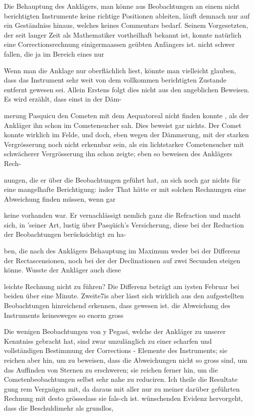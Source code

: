\documentclass[10pt,a4paper]{article}
\begin{document}
Die Behauptung des Anklägers, man könne aus Beobachtungen an einem nicht berichtigten Instrumente keine richtige Positionen ableiten, läuft demnach nur auf ein Geständniss hinaus, welches keines Commentars bedarf. Seinem Vorgesetzten, der seit langer Zeit als Mathematiker vortheilhaft bekannt ist, konnte natürlich eine Correctionsrechnung einigermaassen geübten Anfängers ist. nicht schwer fallen, die ja im Bereich eines nur

Wenn man die Anklage nur oberflächlich liest, könnte man vielleicht glauben, dass das Instrument sehr weit von dem vollkommen berichtigten Zustande entfernt gewesen sei. Allein Erstens folgt dies nicht aus den angeblichen Beweisen. Es wird erzählt, dass einst in der Däm-

merung Pasquicu den Cometen mit dem Aequatoreal nicht finden konnte , als der Ankläger ihn schon im Cometensucher sah. Dies beweist gar nichts. Der Comet konnte wirklich im Felde, und doch, eben wegen der Dämmerung, mit der starken Vergrösserung noch nicht erkennbar sein, als ein lichtstarker Cometensucher mit schwächerer Vergrösserung ihn schon zeigte; eben so beweisen des Anklägers Rech-

nungen, die er über die Beobachtungen geführt hat, an sich noch gar nichts für eine mangelhafte Berichtigung: inder That hätte er mit solchen Rechnungen eine Abweichung finden müssen, wenn gar

keine vorhanden war. Er vernachlässigt nemlich ganz die Refraction und macht sich, in 'seiner Art, lustig über Pasqüich's Versicherung, diese bei der Reduction der Beobachtungen berücksichtigt zu ha-

ben, die nach des Anklägers Behauptung im Maximum weder bei der Differenz der Rectascensionen, noch bei der der Declinationen auf zwei Secunden steigen könne. Wusste der Ankläger auch diese

leichte Rechnung nicht zu führen? Die Differenz beträgt am iysten Februar bei beiden üb\textdegree{}er eine Minute. Zweite7is aber lässt sich wirklich aus den aufgestellten Beobachtungen hinreichend erkennen, dass gewesen ist. die Abweichung des Instruments keinesweges so enorm gross

Die wenigen Beobachtungen von y Pegasi, welche der Ankläger zu unserer Kenntniss gebracht hat, sind zwar unzulänglich zu einer scharfen und vollständigen Bestimmung der Corrections - Elemente des Instruments; sie reichen aber hin, um zu beweisen, dass die Abweichungen nicht so gross sind, um das Auffinden von Sternen zu erschweren; sie reichen ferner hin, um die Cometenbeobachtungen selbst sehr nahe zu reduciren. Ich theile die Resultate gung rem Vergnügen mit, da daraus mit aller nur zu meiner darüber geführten Rechnung mit desto grössedass sie fals-ch ist. wünschenden Evidenz hervorgeht, dass die Beschuldimehr als grundlos,
\end{document}
